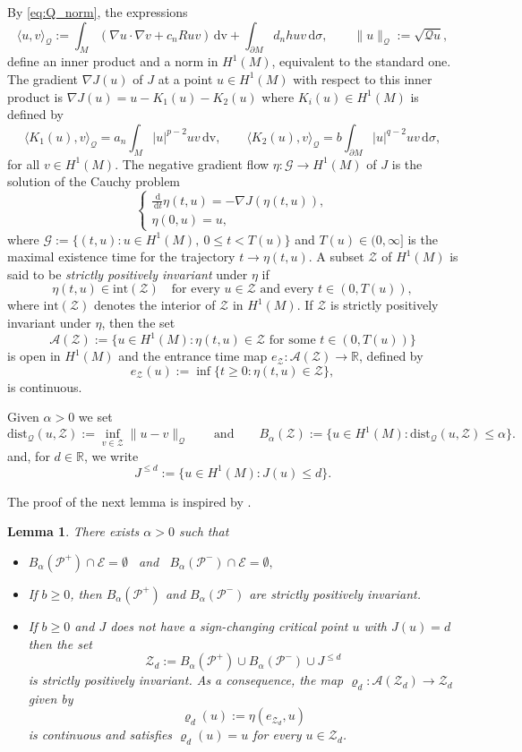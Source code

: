 \documentclass[reqno,11pt,oneside]{amsart}
\newtheorem{lemma}[theorem]{Lemma}
\numberwithin{equation}{section}
\def\r{\mathbb{R}}
\def\im{\int_{M}}
\def\idm{\int_{\partial M}}
\def\vr{\varrho}
\def\cA{\mathcal{A}}
\def\cE{\mathcal{E}}
\def\cP{\mathcal{P}}
\def\cZ{\mathcal{Z}}
\def\d{\,\mathrm{d}}
\def\dv{\,\mathrm{dv}}
\def\dist{\mathrm{dist}}
\begin{document}
By \eqref{eq:Q_norm}, the expressions
$$\langle u,v \rangle_\mathscr{Q}:=\im(\nabla u\cdot\nabla v+c_nRuv)\dv+\idm d_nhuv\d \sigma, \qquad \|u\|_\mathscr{Q}:=\sqrt{\mathscr{Q}u},$$
define an inner product and a norm in $H^1(M)$, equivalent to the standard one. The gradient $\nabla J(u)$ of $J$ at a point $u\in H^1(M)$ with respect to this inner product is $\nabla J(u)=u-K_1(u)-K_2(u)$ where $K_i(u)\in H^1(M)$ is defined by
\begin{equation}\label{eq:defK}
\langle K_1(u),v \rangle_\mathscr{Q}=a_n\im|u|^{p-2}uv\dv,\qquad\langle K_2(u),v \rangle_\mathscr{Q}=b\idm|u|^{q-2}uv\d\sigma,
\end{equation}
for all $v\in H^1(M)$. The negative gradient flow $\eta:\mathcal{G}\to H^1(M)$ of $J$ is the solution of the Cauchy problem
\begin{equation*}
\begin{cases}
\frac{\d}{\d t}\eta(t,u)= - \nabla J(\eta(t,u)),\\
\eta(0,u)= u,
\end{cases}
\end{equation*}
where $\mathcal{G}:= \{ (t,u): u \in H^1(M), \ 0 \leq t < T(u) \}$ and $T(u) \in ( 0, \infty]$ is the maximal existence time for the trajectory $t \to \eta(t,u)$. A subset $\cZ$ of $H^1(M)$ is said to be \emph{strictly positively invariant} under $\eta$ if 
$$\eta(t,u) \in \mathrm{int} (\cZ) \quad \text{for every \ } u \in \cZ \text{ and every } t \in (0,T(u)),$$
where $\mathrm{int}(\mathcal{Z})$ denotes the interior of $\mathcal{Z}$ in $H^1(M)$. If $\cZ$ is strictly positively invariant under $\eta$, then the set
$$\cA(\cZ):= \{ u \in H^1(M): \eta(t,u) \in \cZ\text{ for some } t \in (0,T(u)) \}$$
is open in $H^1(M)$ and the entrance time map $e_{\cZ}: \cA(\cZ)\to\r$, defined by
$$e_{\cZ}(u):= \inf \{ t \geq 0:\eta(t,u)\in\cZ\},$$
is continuous. 

Given $\alpha>0$ we set
$$\dist_\mathscr{Q}(u,\cZ):=\inf_{v\in\cZ}\|u-v\|_\mathscr{Q}\qquad\text{and}\qquad B_\alpha(\cZ):=\{u\in H^1(M):\dist_\mathscr{Q}(u,\cZ)\leq\alpha\}.$$
and, for $d\in\r$, we write 
$$J^{\leq d}:=\{u\in H^1(M):J(u)\leq d\}.$$

The proof of the next lemma is inspired by \cite[Lemma 2]{cw}.

\begin{lemma} \label{lem:invariance}
There exists $\alpha>0$ such that
\begin{itemize}
\item[$(a)$] $B_\alpha(\cP^+)\cap\cE=\emptyset$ \ and \ $B_\alpha(\cP^-)\cap\cE=\emptyset,$
\item[$(b)$] If $b\geq 0$, then $B_\alpha(\cP^+)$ and $B_\alpha(\cP^-)$ are strictly positively invariant. 
\item[$(c)$] If $b\geq 0$ and $J$ does not have a sign-changing critical point $u$ with $J(u)=d$ then the set
$$\cZ_d:=B_\alpha(\cP^+)\cup B_\alpha(\cP^-)\cup J^{\leq d}$$
is strictly positively invariant. As a consequence, the map $\vr_d:\cA(\cZ_d)\to\cZ_d$ given by
$$\vr_d(u):=\eta(e_{\cZ_d},u)$$
is continuous and satisfies $\vr_d(u)=u$ for every $u\in \cZ_d$.
\end{itemize}
\end{lemma}
\end{document}

